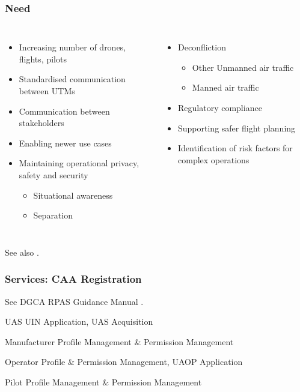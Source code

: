 \documentclass[usenames,dvipsnames,aspectratio=169,serif]{beamer}
\begin{document}

\begin{frame}
   \frametitle{Need}
   \begin{columns}[t]
      \begin{itemize}
         \item Increasing number of drones, flights, pilots
         \item Standardised communication between UTMs
         \item Communication between stakeholders
         \item Enabling newer use cases
         \item Maintaining operational privacy, safety and security
            \begin{itemize}
               \item Situational awareness
               \item Separation
            \end{itemize}
      \end{itemize}
      \begin{itemize}
         \item Deconfliction
            \begin{itemize}
               \item Other Unmanned air traffic
               \item Manned air traffic
            \end{itemize}
         \item Regulatory compliance
         \item Supporting safer flight planning
         \item Identification of risk factors for complex operations
      \end{itemize}
   \end{columns}
   See also \cite{ISO-TR-23629-1-2020}.
\end{frame}


\begin{frame}
   \frametitle{Services: CAA Registration}
   See DGCA RPAS Guidance Manual \cite{RPASGM2020}.
   \begin{block}{UAS}
      UIN Application, UAS Acquisition
   \end{block}

   \begin{block}{Manufacturer}
      Profile Management \& Permission Management
   \end{block}

   \begin{block}{Operator}
      Profile \& Permission Management, UAOP Application
   \end{block}

   \begin{block}{Pilot}
      Profile Management \& Permission Management
   \end{block}
\end{frame}
\end{document}
